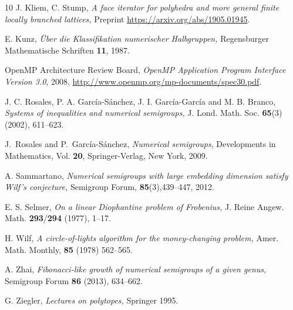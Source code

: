 \documentclass[12pt]{amsart}
\theoremstyle{definition}
\numberwithin{equation}{section}
\renewcommand\>{\rangle}
\newcommand\<{\langle}
\newcommand\0{\mathbf{0}}
\begin{document}
\begin{thebibliography}{10}
 J. Kliem, C. Stump, \emph{A face iterator for polyhedra and more general finite locally branched lattices,} Preprint \url{https://arxiv.org/abs/1905.01945}.

 E. Kunz, \emph{\"Uber die Klassifikation numerischer Halbgruppen,} Regensburger Mathematische Schriften \textbf{11}, 1987.


OpenMP Architecture Review Board,
\emph{OpenMP Application Program Interface Version 3.0},
2008, \url{http://www.openmp.org/mp-documents/spec30.pdf}.  

 J. C. Rosales, P. A. Garc\'ia-S\'anchez, J. I. Garc\'ia-Garc\'ia and M. B. Branco, \emph{Systems of inequalities and numerical semigroups,} J. Lond. Math. Soc. \textbf{65}(3) (2002), 611--623.

J.~Rosales and P.~Garc\'ia-S\'anchez, 
\emph{Numerical semigroups}, 
Developments in Mathematics, Vol. \textbf{20}, Springer-Verlag, New York, 2009.

A. Sammartano, \emph{Numerical semigroups with large embedding dimension satisfy Wilf’s conjecture,} Semigroup
Forum, \textbf{85}(3),439--447, 2012.

 E. S. Selmer, \emph{On a linear Diophantine problem of Frobenius,} J. Reine Angew. Math. \textbf{293}/\textbf{294}
(1977), 1--17.

 H. Wilf, \emph{A circle-of-lights algorithm for the money-changing problem,} Amer. Math. Monthly, \textbf{85} (1978) 562--565.

 A. Zhai, \emph{Fibonacci-like growth of numerical semigroups of a given genus,} 
Semigroup Forum \textbf{86} (2013), 634--662.

 G. Ziegler, \emph{Lectures on polytopes,} Springer 1995.

\end{thebibliography}%


\end{document}
